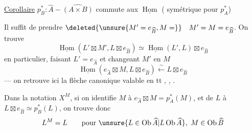 \uline{Corollaire} $p_B^*: \widehat A\mathbin{-}\widehat{(A\times B)}$ commute aux $\underline{\operatorname{Hom}}$
( symétrique pour $p_A^*$)

Il suffit de prendre $\deleted{\unsure{M'=e_{\widehat B},M=}}\quad M'=M=e_{\widehat B}$. On trouve
\[
\underline{\operatorname{Hom}}(L'\boxtimes M',L\boxtimes e_{\widehat B})\simeq\underline{\operatorname{Hom}}(L',L)\boxtimes e_{\widehat B}
\]
en particulier, faisant $L'=e_{\widehat A}$ et changeant $M'$ en $M$
\[
\underline{\operatorname{Hom}}(e_{\widehat A}\boxtimes M,L\boxtimes e_{\widehat B})\xleftarrow{\sim}L\boxtimes e_{\widehat B}
\]
--- on retrouve ici la   flèche canonique
valable en tt , , .

Dans la notation $X^M$, si on identifie $M$ à $e_{\widehat A}\boxtimes M=p_A^*(M)$, et de  $L$ à $L\boxtimes e_{\widehat B}\simeq p_B^*(L)$, on trouve donc
\[
L^M=L\qquad\text{pour }\unsure{L\in\operatorname{Ob}\widehat A|L\operatorname{Ob}\widehat A},\ M\in\operatorname{Ob}\widehat B
\]
